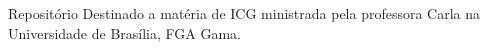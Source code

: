 Repositório Destinado a matéria de I\-C\-G ministrada pela professora Carla na Universidade de Brasília, F\-G\-A Gama. 